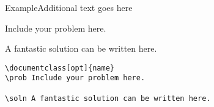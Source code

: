 \documentclass[\string~/GitHub/sthlmNordBeamerTheme/sthlmNordLightDemo.tex]{subfiles}
\begin{document}
\begin{frame}{Example}{Additional text goes here}

	\prob Include your problem here.

	\soln A fantastic solution can be written here.

\begin{beamercodeblock}\vspace{-.6em}
\begin{verbatim}
\documentclass[opt]{name}
\prob Include your problem here.

\soln A fantastic solution can be written here.
\end{verbatim}
\end{beamercodeblock}

\end{frame}
\end{document}
